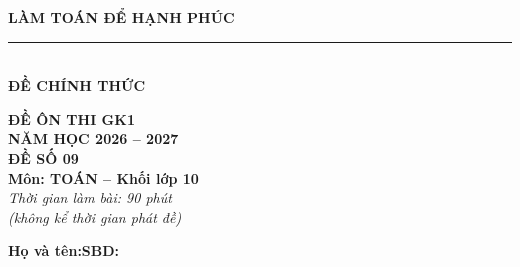 \documentclass[12pt,a4paper]{article}
\begin{document}
\noindent
\begin{minipage}[c]{0.38\textwidth}
    \centering
    \textbf{LÀM TOÁN ĐỂ HẠNH PHÚC}\\[-2pt]
    \rule{3.2cm}{0.6pt}\\[4pt]
    \textbf{ĐỀ CHÍNH THỨC}
\end{minipage}\hfill
\begin{minipage}[c]{0.35\textwidth}
    \centering
    \textbf{ĐỀ ÔN THI GK1}\\
    \textbf{NĂM HỌC 2026 -- 2027}\\[2pt]
    \textbf{ĐỀ SỐ 09}\\
    \textbf{Môn: TOÁN -- Khối lớp 10}\\
    \textit{\small Thời gian làm bài: 90 phút\\(không kể thời gian phát đề)}
\end{minipage}

\vspace{0.2cm}
\noindent
\begin{minipage}[b]{0.78\textwidth}
    \textbf{Họ và tên:}\dotfill\textbf{SBD:}\makebox[3.5cm]{\dotfill}
\end{minipage}\hfill
\begin{minipage}[b]{0.20\textwidth}
    \hfill
    \setlength{\fboxrule}{0.8pt}%
\end{minipage}
\vspace{0.2cm}
\end{document}
